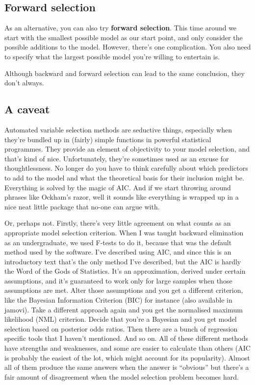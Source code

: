 \documentclass[
  a4paper,
]{book}
\begin{document}
\hypertarget{forward-selection}{%
\subsection{Forward selection}\label{forward-selection}}

As an alternative, you can also try \textbf{forward selection}. This
time around we start with the smallest possible model as our start
point, and only consider the possible additions to the model. However,
there's one complication. You also need to specify what the largest
possible model you're willing to entertain is.

Although backward and forward selection can lead to the same conclusion,
they don't always.

\hypertarget{a-caveat}{%
\subsection{A caveat}\label{a-caveat}}

Automated variable selection methods are seductive things, especially
when they're bundled up in (fairly) simple functions in powerful
statistical programmes. They provide an element of objectivity to your
model selection, and that's kind of nice. Unfortunately, they're
sometimes used as an excuse for thoughtlessness. No longer do you have
to think carefully about which predictors to add to the model and what
the theoretical basis for their inclusion might be. Everything is solved
by the magic of AIC. And if we start throwing around phrases like
Ockham's razor, well it sounds like everything is wrapped up in a nice
neat little package that no-one can argue with.

Or, perhaps not. Firstly, there's very little agreement on what counts
as an appropriate model selection criterion. When I was taught backward
elimination as an undergraduate, we used F-tests to do it, because that
was the default method used by the software. I've described using AIC,
and since this is an introductory text that's the only method I've
described, but the AIC is hardly the Word of the Gods of Statistics.
It's an approximation, derived under certain assumptions, and it's
guaranteed to work only for large samples when those assumptions are
met. Alter those assumptions and you get a different criterion, like the
Bayesian Information Criterion (BIC) for instance (also available in
jamovi). Take a different approach again and you get the normalised
maximum likelihood (NML) criterion. Decide that you're a Bayesian and
you get model selection based on posterior odds ratios. Then there are a
bunch of regression specific tools that I haven't mentioned. And so on.
All of these different methods have strengths and weaknesses, and some
are easier to calculate than others (AIC is probably the easiest of the
lot, which might account for its popularity). Almost all of them produce
the same answers when the answer is ``obvious'' but there's a fair
amount of disagreement when the model selection problem becomes hard.
\end{document}
